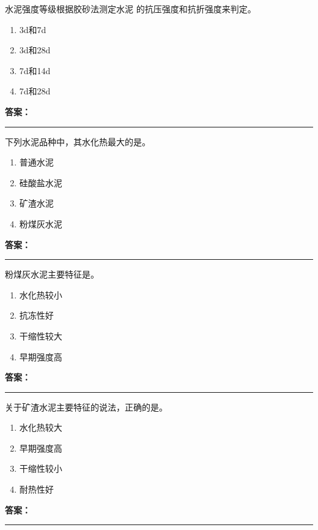 \documentclass[UTF8,fontset=fandol,11pt]{ctexart}
\newcommand{\answerline}{\textcolor{answerred}{\rule{2.4cm}{0.7pt}}}
\begin{document}
\begin{quizbox}[title={第 45 题}]
水泥强度等级根据胶砂法测定水泥 的抗压强度和抗折强度来判定。\\
\begin{enumerate}[label=\Alph*.]
\item 3d和7d
\item 3d和28d
\item 7d和14d
\item 7d和28d
\end{enumerate}
\textbf{\textcolor{answerred}{答案：}} \answerline
\end{quizbox}

\begin{quizbox}[title={第 46 题}]
下列水泥品种中，其水化热最大的是。\\
\begin{enumerate}[label=\Alph*.]
\item 普通水泥
\item 硅酸盐水泥
\item 矿渣水泥
\item 粉煤灰水泥
\end{enumerate}
\textbf{\textcolor{answerred}{答案：}} \answerline
\end{quizbox}

\begin{quizbox}[title={第 47 题}]
粉煤灰水泥主要特征是。\\
\begin{enumerate}[label=\Alph*.]
\item 水化热较小
\item 抗冻性好
\item 干缩性较大
\item 早期强度高
\end{enumerate}
\textbf{\textcolor{answerred}{答案：}} \answerline
\end{quizbox}

\begin{quizbox}[title={第 48 题}]
关于矿渣水泥主要特征的说法，正确的是。\\
\begin{enumerate}[label=\Alph*.]
\item 水化热较大
\item 早期强度高
\item 干缩性较小
\item 耐热性好
\end{enumerate}
\textbf{\textcolor{answerred}{答案：}} \answerline
\end{quizbox}
\end{document}
